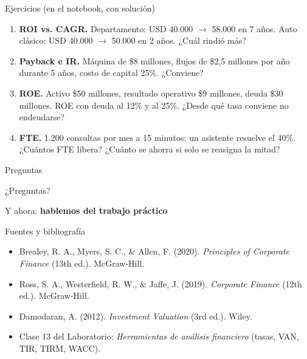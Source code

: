\documentclass[aspectratio=169,10pt]{beamer}
\begin{document}
\begin{frame}{Ejercicios (en el notebook, con solución)}
\begin{enumerate}
  \item \textbf{ROI vs. CAGR.} Departamento: USD 40.000 $\to$ 58.000 en 7 años. Auto clásico:
        USD 40.000 $\to$ 50.000 en 2 años. ¿Cuál rindió más?
  \item \textbf{Payback e IR.} Máquina de \$8 millones, flujos de \$2,5 millones por año durante
        5 años, costo de capital 25\%. ¿Conviene?
  \item \textbf{ROE.} Activo \$50 millones, resultado operativo \$9 millones, deuda \$30 millones.
        ROE con deuda al 12\% y al 25\%. ¿Desde qué tasa conviene no endeudarse?
  \item \textbf{FTE.} 1.200 consultas por mes a 15 minutos; un asistente resuelve el 40\%.
        ¿Cuántos FTE libera? ¿Cuánto se ahorra si solo se reasigna la mitad?
\end{enumerate}
\end{frame}

\begin{frame}{Preguntas}
\begin{center}
\Huge ¿Preguntas?

\vspace{0.6cm}
\normalsize Y ahora: \textbf{hablemos del trabajo práctico}
\end{center}
\end{frame}

\begin{frame}{Fuentes y bibliografía}
\small
\begin{itemize}
  \item Brealey, R. A., Myers, S. C., \& Allen, F. (2020). \emph{Principles of Corporate Finance} (13th ed.). McGraw-Hill.
  \item Ross, S. A., Westerfield, R. W., \& Jaffe, J. (2019). \emph{Corporate Finance} (12th ed.). McGraw-Hill.
  \item Damodaran, A. (2012). \emph{Investment Valuation} (3rd ed.). Wiley.
  \item Clase 13 del Laboratorio: \emph{Herramientas de análisis financiero} (tasas, VAN, TIR, TIRM, WACC).
\end{itemize}
\end{frame}
\end{document}

